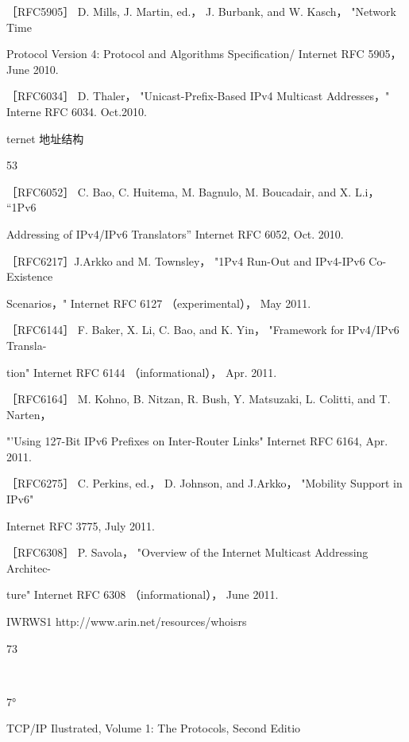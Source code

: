 ［RFC5905］ D. Mills, J. Martin, ed.， J. Burbank, and W. Kasch， "Network Time

Protocol Version 4: Protocol and Algorithms Specification/ Internet RFC 5905，
June 2010.

［RFC6034］ D. Thaler， "Unicast-Prefix-Based IPv4 Multicast Addresses，" Interne
RFC 6034. Oct.2010.

ternet 地址结构

53

［RFC6052］ C. Bao, C. Huitema, M. Bagnulo, M. Boucadair, and X. L.i， “1Pv6

Addressing of IPv4/IPv6 Translators” Internet RFC 6052, Oct. 2010.

［RFC6217］J.Arkko and M. Townsley， "1Pv4 Run-Out and IPv4-IPv6 Co-Existence

Scenarios，" Internet RFC 6127 （experimental）， May 2011.

［RFC6144］ F. Baker, X. Li, C. Bao, and K. Yin， "Framework for IPv4/IPv6 Transla-

tion" Internet RFC 6144 （informational）， Apr. 2011.

［RFC6164］ M. Kohno, B. Nitzan, R. Bush, Y. Matsuzaki, L. Colitti, and T. Narten，

"'Using 127-Bit IPv6 Prefixes on Inter-Router Links" Internet RFC 6164, Apr. 2011.

［RFC6275］ C. Perkins, ed.， D. Johnson, and J.Arkko， "Mobility Support in IPv6"

Internet RFC 3775, July 2011.

［RFC6308］ P. Savola， "Overview of the Internet Multicast Addressing Architec-

ture" Internet RFC 6308 （informational）， June 2011.

IWRWS1 http://www.arin.net/resources/whoisrs

73

~

7°

TCP/IP Ilustrated, Volume 1: The Protocols, Second Editio